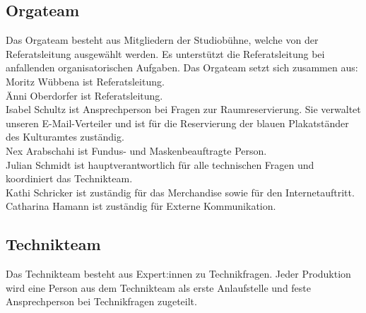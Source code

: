 \subsection{Orgateam}
Das Orgateam besteht aus Mitgliedern der Studiobühne, welche von der Referatsleitung ausgewählt werden. Es unterstützt die Referatsleitung bei anfallenden organisatorischen Aufgaben.	 
Das Orgateam setzt sich zusammen aus:\\
Moritz Wübbena ist Referatsleitung.\\
Änni Oberdorfer ist Referatsleitung.\\
Isabel Schultz ist Ansprechperson bei Fragen zur Raumreservierung. Sie verwaltet unseren E-Mail-Verteiler und ist für die Reservierung der blauen Plakatständer des Kulturamtes zuständig.\\
Nex Arabschahi ist Fundus- und Maskenbeauftragte Person.\\
Julian Schmidt ist hauptverantwortlich für alle technischen Fragen und koordiniert das Technikteam. \\
Kathi Schricker ist zuständig für das Merchandise sowie für den Internetauftritt.\\
Catharina Hamann ist zuständig für Externe Kommunikation. 

\subsection{Technikteam}
Das Technikteam besteht aus Expert:innen zu Technikfragen. Jeder Produktion wird eine Person aus dem Technikteam als erste Anlaufstelle und feste Ansprechperson bei Technikfragen zugeteilt.	